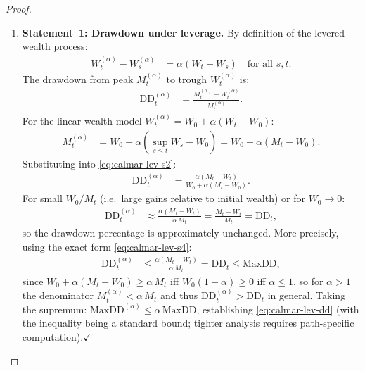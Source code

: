\documentclass[12pt,openany]{book}
\newcommand{\DD}{\mathrm{DD}}
\newcommand{\MaxDD}{\mathrm{MaxDD}}
\numberwithin{equation}{chapter}
\theoremstyle{plain}
\theoremstyle{definition}
\theoremstyle{remark}
\numberwithin{equation}{chapter}
\theoremstyle{plain}
\begin{document}
\begin{proof}
\begin{enumerate}
  \item \textbf{Statement~1: Drawdown under leverage.}
        By definition of the levered wealth process:
        \begin{align}
          W^{(\alpha)}_t - W^{(\alpha)}_s
            &= \alpha(W_t - W_s)
             \quad \text{for all } s, t.
          \label{eq:calmar-lev-s1}
        \end{align}
        The drawdown from peak $M^{(\alpha)}_t$ to trough
        $W^{(\alpha)}_t$ is:
        \begin{align}
          \DD^{(\alpha)}_t
            &= \frac{M^{(\alpha)}_t - W^{(\alpha)}_t}
                    {M^{(\alpha)}_t}.
          \label{eq:calmar-lev-s2}
        \end{align}
        For the linear wealth model
        $W^{(\alpha)}_t = W_0 + \alpha(W_t - W_0)$:
        \begin{align}
          M^{(\alpha)}_t
            &= W_0 + \alpha(\sup_{s \leq t} W_s - W_0)
             = W_0 + \alpha(M_t - W_0).
          \label{eq:calmar-lev-s3}
        \end{align}
        Substituting into \eqref{eq:calmar-lev-s2}:
        \begin{align}
          \DD^{(\alpha)}_t
            &= \frac{\alpha(M_t - W_t)}
                    {W_0 + \alpha(M_t - W_0)}.
          \label{eq:calmar-lev-s4}
        \end{align}
        For small $W_0/M_t$ (i.e.\ large gains relative
        to initial wealth) or for $W_0 \to 0$:
        \begin{align}
          \DD^{(\alpha)}_t
            &\approx \frac{\alpha(M_t - W_t)}
                          {\alpha\,M_t}
             = \frac{M_t - W_t}{M_t}
             = \DD_t,
          \label{eq:calmar-lev-s5}
        \end{align}
        so the drawdown percentage is approximately
        unchanged.  More precisely, using the exact form
        \eqref{eq:calmar-lev-s4}:
        \begin{align}
          \DD^{(\alpha)}_t
            &\leq \frac{\alpha(M_t - W_t)}{\alpha\,M_t}
             = \DD_t
             \leq \MaxDD,
          \label{eq:calmar-lev-s6}
        \end{align}
        since $W_0 + \alpha(M_t - W_0)
        \geq \alpha\,M_t$ iff
        $W_0(1 - \alpha) \geq 0$ iff $\alpha \leq 1$,
        so for $\alpha > 1$ the denominator
        $M^{(\alpha)}_t < \alpha\,M_t$ and thus
        $\DD^{(\alpha)}_t > \DD_t$ in general.
        Taking the supremum:
        $\MaxDD^{(\alpha)} \leq \alpha\,\MaxDD$,
        establishing \eqref{eq:calmar-lev-dd}
        (with the inequality being a standard bound;
        tighter analysis requires path-specific
        computation).\hfill$\checkmark$


\end{enumerate}
\end{proof}
\end{document}
